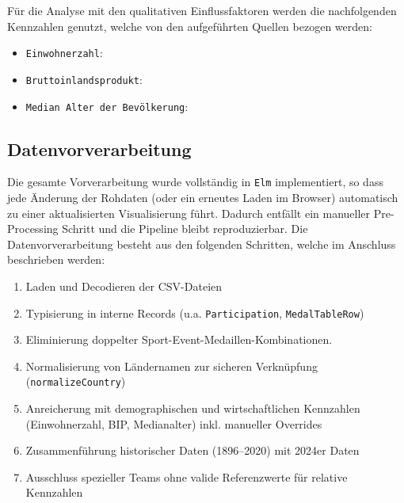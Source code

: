 Für die Analyse mit den qualitativen Einflussfaktoren werden die nachfolgenden Kennzahlen genutzt, welche von den aufgeführten Quellen bezogen werden:
\begin{itemize}
    \item \texttt{Einwohnerzahl}: \cite{kagglePopulation}
    \item \texttt{Bruttoinlandsprodukt}: \cite{kaggleBIP}
    \item  \texttt{Median Alter der Bevölkerung}: \cite{kagglePopulation}
\end{itemize}

\subsection{Datenvorverarbeitung}



Die gesamte Vorverarbeitung wurde vollständig in \texttt{Elm} implementiert, so dass jede Änderung der Rohdaten (oder ein erneutes Laden im Browser) automatisch zu einer aktualisierten Visualisierung führt. Dadurch entfällt ein manueller Pre-Processing Schritt und die Pipeline bleibt reproduzierbar. Die Datenvorverarbeitung besteht aus den folgenden Schritten, welche im Anschluss beschrieben werden:

\begin{enumerate}
    \item Laden und Decodieren der CSV-Dateien
    \item Typisierung in interne Records (u.a. \texttt{Participation}, \texttt{MedalTableRow})
    \item Eliminierung doppelter Sport-Event-Medaillen-Kombinationen.
    \item Normalisierung von Ländernamen zur sicheren Verknüpfung (\texttt{normalizeCountry})
    \item Anreicherung mit demographischen und wirtschaftlichen Kennzahlen (Einwohnerzahl, BIP, Medianalter) inkl. manueller Overrides
    \item Zusammenführung historischer Daten (1896–2020) mit 2024er Daten
    \item Ausschluss spezieller Teams ohne valide Referenzwerte für relative Kennzahlen
\end{enumerate}

